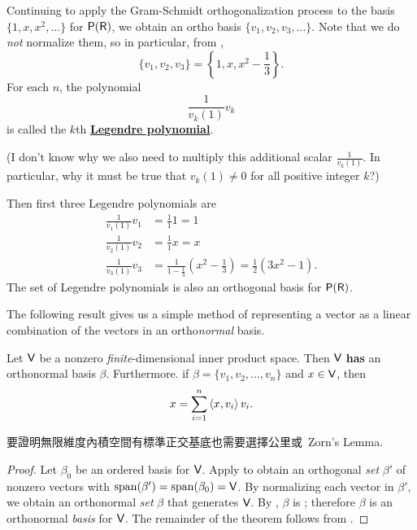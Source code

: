 \begin{remark} \label{remark 6.2.4}
Continuing to apply the Gram-Schmidt orthogonalization process to the basis \(\{ 1, x, x^2, ... \}\) for \(\textsf{P}(\textsf{R})\), we obtain an ortho\emph{\textbf{}} basis \(\{ v_1, v_2, v_3, ... \}\).
Note that we do \emph{not} normalize them, so in particular, from ,
\[
    \{ v_1, v_2, v_3 \} = \left\{ 1, x, x^2 - \frac{1}{3} \right\}.
\]
For each \(n\), the polynomial
\[
    \frac{1}{v_k(1)} v_k
\]
is called the \(k\)th \textbf{\href{https://www.wikiwand.com/en/Legendre_polynomials\#/Orthogonality_and_completeness}{Legendre polynomial}}.

(I don't know why we also need to multiply this additional scalar \(\frac{1}{v_k(1)}\).
In particular, why it must be true that \(v_k(1) \ne 0\) for all positive integer \(k\)?)

Then first three Legendre polynomials are
\begin{align*}
    \frac{1}{v_1(1)} v_1 & = \frac{1}{1} 1 = 1 \\
    \frac{1}{v_2(1)} v_2 & = \frac{1}{1} x = x \\
    \frac{1}{v_3(1)} v_3 & = \frac{1}{1 - \frac{1}{3}} \left( x^2 - \frac{1}{3} \right) = \frac{1}{2}(3x^2 - 1).
\end{align*}
The set of Legendre polynomials is also an orthogonal basis for \(\textsf{P}(\textsf{R})\).
\end{remark}

The following result gives us a simple method of representing a vector as a linear combination of the vectors in an ortho\emph{normal} basis.

\begin{theorem} \label{thm 6.5}
Let \(\textsf{V}\) be a nonzero \emph{finite}-dimensional inner product space.
Then \(\textsf{V}\) \textbf{has} an orthonormal basis \(\beta\).
Furthermore. if \(\beta = \{ v_1, v_2, ..., v_n \}\) and \(x \in \textsf{V}\), then
\[
    x = \sum_{i = 1}^n \left< x, v_i \right> v_i.
\]
\end{theorem}

\begin{note}
要證明無限維度內積空間有標準正交基底也需要選擇公里或\ Zorn's Lemma.
\end{note}

\begin{proof}
Let \(\beta_0\) be an ordered basis for \(\textsf{V}\).
Apply  to obtain an orthogonal \emph{set} \(\beta'\) of nonzero vectors with \(\operatorname{span}(\beta') = \operatorname{span}(\beta_0) = \textsf{V}\).
By normalizing each vector in \(\beta'\), we obtain an orthonormal \emph{set} \(\beta\) that generates \(\textsf{V}\).
By , \(\beta\) is \LID{}; therefore \(\beta\) is an orthonormal \emph{basis} for \(\textsf{V}\).
The remainder of the theorem follows from .
\end{proof}


